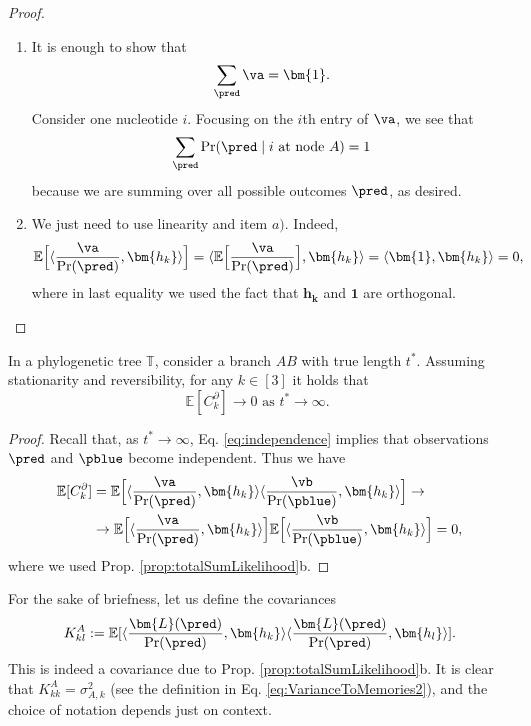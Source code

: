 \begin{appendices}
\begin{proof}
\begin{enumerate}[label=\alph*)]
\item It  is enough to show that 
 \begin{equation} \label{eq:sum1}
      \sum _\pred \va = \bm{1}.
 \end{equation}
Consider one nucleotide $i$. Focusing on the $i$th entry of $\va$, we see that \[\sum_\pred \Pr(\pred  \mid  \text{$i$ at node $A$}) = 1\]
because we are summing over all possible outcomes $\pred$, as desired.
\item We just need to use linearity and item $a)$. Indeed,
\begin{equation}
\mathbb{E}\Big[\langle \frac{\va}{\Pr(\pred)}, \bm{h_k}\rangle\Big] =\langle  \mathbb{E}\Big[\frac{\va}{\Pr(\pred)}\Big], \bm{h_k}\rangle = \langle  \bm{1}, \bm{h_k}\rangle = 0,
\end{equation} 
where in last equality we used the fact that $\bm{h_k}$ and $\bm{1}$ are orthogonal.
\end{enumerate}
\end{proof}
 
 

\begin{prop} \label{prop:CoherenceToZero} In a phylogenetic tree $\mathbb{T}$, consider a branch $AB$ with true length $t^*$. Assuming stationarity and reversibility, for any $k \in [3]$ it holds that 
    \[ \mathbb{E}[C^\partial_k] \to 0 \text{ as $t^* \to \infty$. }\]
\end{prop}
\begin{proof}
Recall that, as $t^* \to \infty$, Eq. \ref{eq:independence} implies that 
 observations $\pred$ and $\pblue$ become independent. Thus we have
 \begin{align}
    \mathbb{E}[C^\partial_k] &= \mathbb{E}\Big[  \langle \frac{\va}{\Pr(\pred)},\bm{h_k}\rangle \langle \frac{\vb}{\Pr(\pblue)}, \bm{h_k} \rangle \Big] \to \\
    &\to  \mathbb{E}\Big[  \langle \frac{\va}{\Pr(\pred)},\bm{h_k}\rangle \Big] \mathbb{E}\Big[ \langle \frac{\vb}{\Pr(\pblue)}, \bm{h_k} \rangle \Big] = 0,
\end{align}
where we used Prop. \ref{prop:totalSumLikelihood}b.

\end{proof}


For the sake of briefness, let us define the covariances
\begin{equation} \label{eq:covariances}
K^A_{kl} :=  \mathbb{E}[\langle \frac{\bm{L}(\pred)}{\Pr(\pred)}, \bm{h_k} \rangle \langle \frac{\bm{L}(\pred)}{\Pr(\pred)}, \bm{h_l} \rangle].
\end{equation}
This is indeed a covariance due to Prop. \ref{prop:totalSumLikelihood}b. It is clear that ${K^A_{kk} = \sigma^2_{A,k}}$ (see the definition in Eq. \ref{eq:VarianceToMemories2}), and the choice of notation depends just on context.


\end{appendices}
